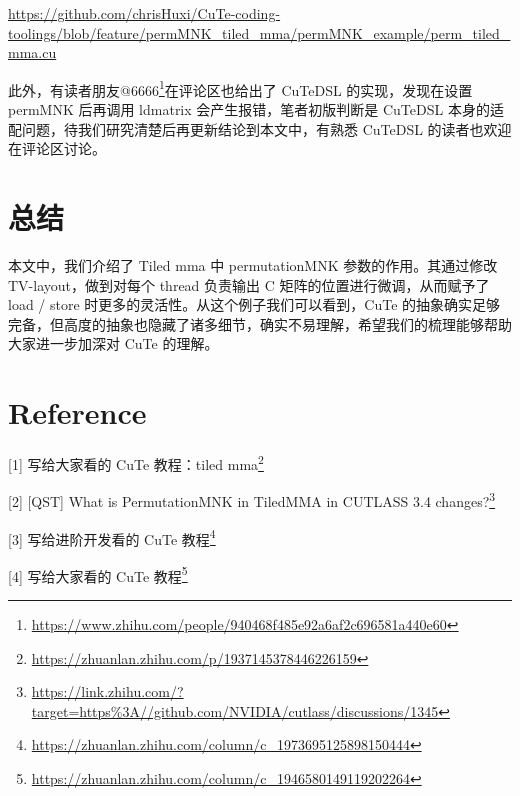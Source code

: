 \url{https://github.com/chrisHuxi/CuTe-coding-toolings/blob/feature/permMNK_tiled_mma/permMNK_example/perm_tiled_mma.cu}

此外，有读者朋友@6666\footnote{\url{https://www.zhihu.com/people/940468f485e92a6af2c696581a440e60}}在评论区也给出了 CuTeDSL 的实现，发现在设置 permMNK 后再调用 ldmatrix 会产生报错，笔者初版判断是 CuTeDSL 本身的适配问题，待我们研究清楚后再更新结论到本文中，有熟悉 CuTeDSL 的读者也欢迎在评论区讨论。

\section{总结}

本文中，我们介绍了 Tiled mma 中 permutationMNK 参数的作用。其通过修改 TV-layout，做到对每个 thread 负责输出 C 矩阵的位置进行微调，从而赋予了 load / store 时更多的灵活性。从这个例子我们可以看到，CuTe 的抽象确实足够完备，但高度的抽象也隐藏了诸多细节，确实不易理解，希望我们的梳理能够帮助大家进一步加深对 CuTe 的理解。

\section{Reference}

[1] 写给大家看的 CuTe 教程：tiled mma\footnote{\url{https://zhuanlan.zhihu.com/p/1937145378446226159}}

[2] [QST] What is PermutationMNK in TiledMMA in CUTLASS 3.4 changes?\footnote{\url{https://link.zhihu.com/?target=https\%3A//github.com/NVIDIA/cutlass/discussions/1345}}

[3] 写给进阶开发看的 CuTe 教程\footnote{\url{https://zhuanlan.zhihu.com/column/c_1973695125898150444}}

[4] 写给大家看的 CuTe 教程\footnote{\url{https://zhuanlan.zhihu.com/column/c_1946580149119202264}}
